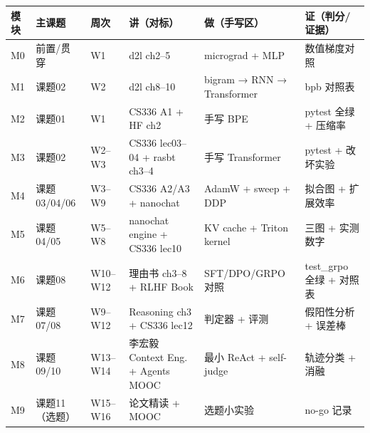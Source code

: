 \documentclass[
  chinese,
  11pt,
]{ctexart}
\newcounter{none} %
\begin{document}
{\def\LTcaptype{none} %
\begin{longtable}[]{@{}
  >{\raggedright\arraybackslash}p{}
  >{\raggedright\arraybackslash}p{}
  >{\raggedright\arraybackslash}p{}
  >{\raggedright\arraybackslash}p{}
  >{\raggedright\arraybackslash}p{}
  >{\raggedright\arraybackslash}p{}@{}}
\toprule\noalign{}
\begin{minipage}[b]{\linewidth}\raggedright
模块
\end{minipage} & \begin{minipage}[b]{\linewidth}\raggedright
主课题
\end{minipage} & \begin{minipage}[b]{\linewidth}\raggedright
周次
\end{minipage} & \begin{minipage}[b]{\linewidth}\raggedright
讲（对标）
\end{minipage} & \begin{minipage}[b]{\linewidth}\raggedright
做（手写区）
\end{minipage} & \begin{minipage}[b]{\linewidth}\raggedright
证（判分/证据）
\end{minipage} \\
\midrule\noalign{}
\endhead
\bottomrule\noalign{}
\endlastfoot
M0 & 前置/贯穿 & W1 & d2l ch2--5 & micrograd + MLP & 数值梯度对照 \\
M1 & 课题02 & W2 & d2l ch8--10 & bigram → RNN → Transformer & bpb 对照表 \\
M2 & 课题01 & W1 & CS336 A1 + HF ch2 & 手写 BPE & pytest 全绿 + 压缩率 \\
M3 & 课题02 & W2--W3 & CS336 lec03--04 + rasbt ch3--4 & 手写 Transformer & pytest + 改坏实验 \\
M4 & 课题03/04/06 & W3--W9 & CS336 A2/A3 + nanochat & AdamW + sweep + DDP & 拟合图 + 扩展效率 \\
M5 & 课题04/05 & W5--W8 & nanochat engine + CS336 lec10 & KV cache + Triton kernel & 三图 + 实测数字 \\
M6 & 课题08 & W10--W12 & 理由书 ch3--8 + RLHF Book & SFT/DPO/GRPO 对照 & test\_grpo 全绿 + 对照表 \\
M7 & 课题07/08 & W9--W12 & Reasoning ch3 + CS336 lec12 & 判定器 + 评测 & 假阳性分析 + 误差棒 \\
M8 & 课题09/10 & W13--W14 & 李宏毅 Context Eng. + Agents MOOC & 最小 ReAct + self-judge & 轨迹分类 + 消融 \\
M9 & 课题11（选题） & W15--W16 & 论文精读 + MOOC & 选题小实验 & no-go 记录 \\
\end{longtable}
}
\end{document}
